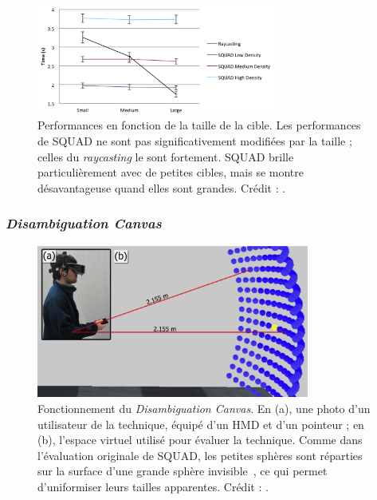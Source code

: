 \begin{appendices}
	\begin{figure}[!htbp]
		\centering
		\includegraphics[width=0.7\textwidth]{figures/ch2/squadRecap}
		\caption[SQUAD : erformances et taille des cibles.]{Performances en fonction de la taille de la cible. Les performances de SQUAD ne sont pas significativement modifiées par la taille ; celles du \emph{raycasting} le sont fortement. SQUAD brille particulièrement avec de petites cibles, mais se montre désavantageuse quand elles sont grandes. Crédit : \cite{kopper2011rapid}.}
		\label{fig:squadRecap}
	\end{figure}



	
	\subsubsection{\emph{Disambiguation Canvas}}
	
	\begin{figure}[!htbp]
		\centering
		\includegraphics[width=0.80\textwidth]{figures/ch2/dCanvas2}
		\caption[\emph{Disambiguation Canvas}, bis]{Fonctionnement du \emph{Disambiguation Canvas}. En (a), une photo d'un utilisateur de la technique, équipé d'un HMD et d'un pointeur ; en (b), l'espace virtuel utilisé pour évaluer la technique. Comme dans l'évaluation originale de SQUAD, les petites sphères sont réparties sur la surface d'une grande sphère invisible~\cite{kopper2011rapid}, ce qui permet d'uniformiser leurs tailles apparentes. Crédit : \cite{debarba2013disambiguation}.}
		\label{fig:dCanvas2}
	\end{figure}
	

\end{appendices}

